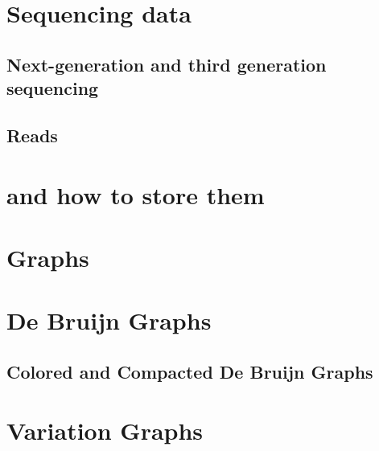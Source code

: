 \section{Sequencing data}
\subsection{Next-generation and third generation sequencing}
\subsection{Reads}

\section{\kmers and how to store them}


\section{Graphs}

\section{De Bruijn Graphs}
\subsection{Colored and Compacted De Bruijn Graphs}
\section{Variation Graphs}

